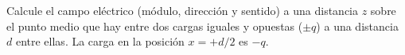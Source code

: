 \documentclass[a4paper,10pt]{article}
\renewcommand*{\ejBloque}{2}
\begin{document}

% 
\begin{qboxshort}
    Calcule el campo eléctrico (módulo, dirección y sentido) a una distancia
    $z$ sobre el punto medio que hay entre dos cargas iguales y opuestas
    ($\pm q$) a una distancia $d$ entre ellas. La carga en la posición
    $x= +d/2$ es $-q$.
\end{qboxshort}


\end{document}
